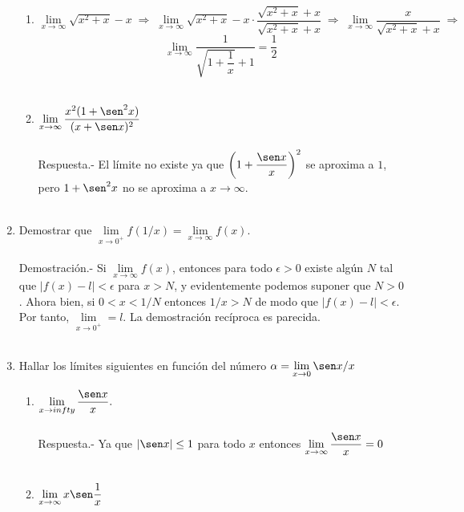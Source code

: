 \begin{enumerate}
\begin{enumerate}[\bfseries (i)]
    \item $\lim\limits_{x\to \infty} \sqrt{x^2+x}-x \; \Longrightarrow \;\lim\limits_{x\to \infty} \sqrt{x^2+x}-x \cdot \dfrac{\sqrt{x^2+x}+x}{\sqrt{x^2+x}+x} \; \Longrightarrow \; \lim\limits_{x\to \infty} \dfrac{x}{\sqrt{x^2+x}+x} \; \Longrightarrow \;$ $$\lim\limits_{x\to \infty} \dfrac{1}{\sqrt{1+\dfrac{1}{x}}+1} = \dfrac{1}{2}$$\\ 

    \item $\lim\limits_{x\to \infty} \dfrac{x^2(1+\sen^2 x)}{(x+\sen x)^2}$\\\\
	Respuesta.-\; El límite no existe ya que $\left(1+\dfrac{\sen x}{x}\right)^2$ se aproxima a $1$, pero $1+\sen^2 x$ no se aproxima a ${x\to \infty}$.\\\\

\end{enumerate}

\item Demostrar que $\lim\limits_{x\to 0^+}f(1/x) = \lim\limits_{x\to \infty}f(x)$.\\\\
    Demostración.-\; Si $\lim\limits_{x\to \infty} f(x)$, entonces para todo $\epsilon>0$ existe algún $N$ tal que $|f(x)-l|<\epsilon$ para $x>N$, y evidentemente podemos suponer que $N>0$. Ahora bien, si $0<x<1/N$ entonces $1/x>N$ de modo que $|f(x)-l|<\epsilon$. Por tanto, $\lim\limits_{x\to 0^+} = l$. La demostración recíproca es parecida.\\\\

\item Hallar los límites siguientes en función del número $\alpha=\lim\limits_{x\to 0} \sen x / x$
\begin{enumerate}[\bfseries (i)]

    \item $\lim\limits_{x\to infty} \dfrac{\sen x}{x}.$\\\\
	Respuesta.-\; Ya que $|\sen x|\leq 1$ para todo $x$ entonces $\lim\limits_{x\to \infty}\dfrac{\sen x}{x} = 0$\\\\

    \item $\lim\limits_{x\to \infty}x \sen \dfrac{1}{x}$\\\\


\end{enumerate}
\end{enumerate}
